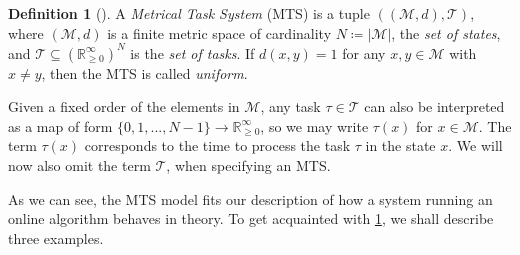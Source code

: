 \documentclass[10pt]{amsart}
\theoremstyle{definition}
\newtheorem{definition}{Definition}
\theoremstyle{remark}
\begin{document}
    \begin{figure}[!hbtp]
        \centering
    \end{figure}

    \begin{definition}[{\cite[pp. 75-76]{Woeginger}}] \label{mts_definition}
        A \emph{Metrical Task System} (MTS) is a tuple \(((\mathcal{M}, d), \mathcal{T})\), where \((\mathcal{M}, d)\) is a finite metric space of cardinality \(N \coloneqq |\mathcal{M}|\), the \emph{set of states}, and \(\mathcal{T} \subseteq \left(\mathbb{R}_{\geq 0}^\infty\right)^N\) is the \emph{set of tasks}. If \(d(x, y) = 1\) for any \(x, y \in \mathcal{M}\) with \(x \neq y\), then the MTS is called \emph{uniform}.
    \end{definition}
    
    Given a fixed order of the elements in \(\mathcal{M}\), any task \(\tau \in \mathcal{T}\) can also be interpreted as a map of form \(\{0, 1, ..., N-1\} \to \mathbb{R}_{\geq 0}^\infty\), so we may write \(\tau(x)\) for \(x \in \mathcal{M}\). The term \(\tau(x)\) corresponds to the time to process the task \(\tau\) in the state \(x\). We will now also omit the term \(\mathcal{T}\), when specifying an MTS.

    \begin{figure}[!hbtp]
        \centering
    \end{figure}

    As we can see, the MTS model fits our description of how a system running an online algorithm behaves in theory. To get acquainted with \cref{mts_definition}, we shall describe three examples.
\end{document}
